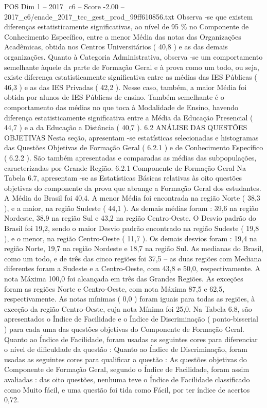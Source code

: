 \begin{textsample}{POS Dim 1 – 2017\_c6 – Score -2.00 – 2017\_c6/enade\_2017\_tec\_gest\_prod\_99ff610856.txt}
Observa -se que existem diferenças estatisticamente significativas, ao nível de 95 \% no Componente de Conhecimento Específico, entre a menor Média das notas das Organizações Acadêmicas, obtida nos Centros Universitários ( 40,8 ) e as das demais organizações.
Quanto à Categoria Administrativa, observa -se um comportamento semelhante àquele da parte de Formação Geral e à prova como um todo, ou seja, existe diferença estatisticamente significativa entre as médias das IES Públicas ( 46,3 ) e as das IES Privadas ( 42,2 ).
Nesse caso, também, a maior Média foi obtida por alunos de IES Públicas de ensino.
Também semelhante é o comportamento das médias no que toca à Modalidade de Ensino, havendo diferença estatisticamente significativa entre a Média da Educação Presencial ( 44,7 ) e a da Educação a Distância ( 40,7 ). 6.2 ANÁLISE DAS QUESTÕES OBJETIVAS Nesta seção, apresentam -se estatísticas selecionadas e histogramas das Questões Objetivas de Formação Geral ( 6.2.1 ) e de Conhecimento Específico ( 6.2.2 ).
São também apresentadas e comparadas as médias das subpopulações, caracterizadas por Grande Região. 6.2.1 Componente de Formação Geral Na Tabela 6.7, apresentam -se as Estatísticas Básicas relativas às oito questões objetivas do componente da prova que abrange a Formação Geral dos estudantes.
A Média do Brasil foi 40,4.
A menor Média foi encontrada na região Norte ( 38,3 ), e a maior, na região Sudeste ( 44,1 ).
As demais médias foram : 39,6 na região Nordeste, 38,9 na região Sul e 43,2 na região Centro-Oeste.
O Desvio padrão do Brasil foi 19,2, sendo o maior Desvio padrão encontrado na região Sudeste ( 19,8 ), e o menor, na região Centro-Oeste ( 11,7 ).
Os demais desvios foram : 19,4 na região Norte, 19,7 na região Nordeste e 18,7 na região Sul.
As medianas do Brasil, como um todo, e de três das cinco regiões foi 37,5 – as duas regiões com Mediana diferentes foram a Sudeste e a Centro-Oeste, com 43,8 e 50,0, respectivamente.
A nota Máxima 100,0 foi alcançada em três das Grandes Regiões.
As exceções foram as regiões Norte e Centro-Oeste, com nota Máxima 87,5 e 62,5, respectivamente.
As notas mínimas ( 0,0 ) foram iguais para todas as regiões, à exceção da região Centro-Oeste, cuja nota Mínima foi 25,0.
Na Tabela 6.8, são apresentados o Índice de Facilidade e o Índice de Discriminação ( ponto-bisserial ) para cada uma das questões objetivas do Componente de Formação Geral.
Quanto ao Índice de Facilidade, foram usadas as seguintes cores para diferenciar o nível de dificuldade da questão : Quanto ao Índice de Discriminação, foram usadas as seguintes cores para qualificar a questão : As questões objetivas do Componente de Formação Geral, segundo o Índice de Facilidade, foram assim avaliadas : das oito questões, nenhuma teve o Índice de Facilidade classificado como Muito fácil, e uma questão foi tida como Fácil, por ter índice de acertos 0,72.

\end{textsample}
